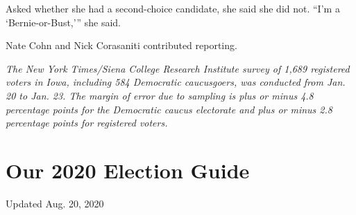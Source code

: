 Asked whether she had a second-choice candidate, she said she did not.
``I'm a `Bernie-or-Bust,''' she said.

Nate Cohn and Nick Corasaniti contributed reporting.

\emph{The New York Times/Siena College Research Institute survey of
1,689 registered voters in Iowa, including 584 Democratic caucusgoers,
was conducted from Jan. 20 to Jan. 23. The margin of error due to
sampling is plus or minus 4.8 percentage points for the Democratic
caucus electorate and plus or minus 2.8 percentage points for registered
voters.}

\hypertarget{our-2020-election-guide}{%
\section{Our 2020 Election Guide}\label{our-2020-election-guide}}

Updated Aug. 20, 2020

